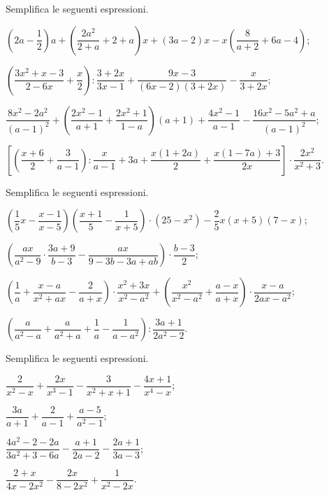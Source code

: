 \begin{esercizio}[\Ast]
\label{ese:14.47}
Semplifica le seguenti espressioni.
\begin{enumeratea}
 \item $\left(2a-\dfrac{1}{2}\right)a+\left(\dfrac{2a^{2}}{2+a}+2+a\right)x+(3a-2)x-x\left(\dfrac{8}{a+2}+6a-4\right)$;
 \item $\left(\dfrac{3x^{2}+x-3}{2-6x}+\dfrac{x}{2}\right):\dfrac{3+2x}{3x-1}+\dfrac{9x-3}{(6x-2)(3+2x)}-\dfrac{x}{3+2x}$;
 \item $\dfrac{8x^{2}-2a^{2}}{(a-1)^{2}}+\left(\dfrac{2x^{2}-1}{a+1}+\dfrac{2x^{2}+1}{1-a}\right)(a+1)+\dfrac{4x^{2}-1}{a-1}-\dfrac{16x^{2}-5a^{2}+a}{(a-1)^{2}}$;
 \item $\left[\left(\dfrac{x+6}{2}+\dfrac{3}{a-1}\right):\dfrac{x}{a-1}+3a+\dfrac{x(1+2a)}{2}+\dfrac{x(1-7a)+3}{2x}\right]\cdot {\dfrac{2x^{2}}{x^{2}+3}}$.
\end{enumeratea}
\end{esercizio}

\begin{esercizio}[\Ast]
\label{ese:14.48}
Semplifica le seguenti espressioni.
\begin{enumeratea}
 \item $\left(\dfrac{1}{5}x-\dfrac{x-1}{x-5}\right)\left(\dfrac{x+1}{5}-\dfrac{1}{x+5}\right)\cdot (25-x^{2})-\dfrac{2}{5}x(x+5)(7-x)$;
 \item $\left(\dfrac{ax}{a^{2}-9}\cdot {\dfrac{3a+9}{b-3}}-\dfrac{ax}{9-3b-3a+ab}\right)\cdot {\dfrac{b-3}{2}}$;
 \item $\left(\dfrac{1}{a}+\dfrac{x-a}{x^{2}+ax}-\dfrac{2}{a+x}\right)\cdot {\dfrac{x^{2}+3x}{x^{2}-a^{2}}}+\left(\dfrac{x^{2}}{x^{2}-a^{2}}+\dfrac{a-x}{a+x}\right)\cdot {\dfrac{x-a}{2ax-a^{2}}}$;
 \item $\left(\dfrac{a}{a^{2}-a}+\dfrac{a}{a^{2}+a}+\dfrac{1}{a}-\dfrac{1}{a-a^{2}}\right):\dfrac{3a+1}{2a^{2}-2}$.
\end{enumeratea}
\end{esercizio}

\begin{esercizio}[\Ast]
\label{ese:14.49}
Semplifica le seguenti espressioni.
\begin{multicols}{2}
\begin{enumeratea}
 \item $\dfrac{2}{x^{2}-x}+\dfrac{2x}{x^{3}-1}-\dfrac{3}{x^{2}+x+1}-\dfrac{4x+1}{x^{4}-x}$;
 \item $\dfrac{3a}{a+1}+\dfrac{2}{a-1}+\dfrac{a-5}{a^{2}-1}$;
 \item $\dfrac{4a^{2}-2-2a}{3a^{2}+3-6a}-\dfrac{a+1}{2a-2}-\dfrac{2a+1}{3a-3}$;
 \item $\dfrac{2+x}{4x-2x^{2}}-\dfrac{2x}{8-2x^{2}}+\dfrac{1}{x^{2}-2x}$.
\end{enumeratea}
\end{multicols}
\end{esercizio}

